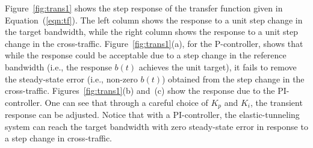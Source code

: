 \documentclass{article}
\begin{document}
Figure~\ref{fig:trans1} shows
 the step response of the
transfer function given in
Equation~(\ref{eqn:tf}).
The left column 
shows  the response to a unit step change
in the target bandwidth, while the right column 
shows the
response to a unit step change in the cross-traffic. 
Figure~\ref{fig:trans1}(a),
for the P-controller,
shows that while the response could be acceptable due to
a step change in the reference bandwidth (i.e., the response $b(t)$ achieves the unit target), 
it fails to remove the steady-state
error (i.e., non-zero $b(t)$) obtained from the step change in the cross-traffic. 
Figures~\ref{fig:trans1}(b) and~(c)
show the response due to the PI-controller. 
One can
see that through a careful choice of $K_p$ and $K_i$, the transient
response can be adjusted.  
Notice that with a PI-controller,
the elastic-tunneling system can reach the target bandwidth with
zero steady-state error in response to a step change
in cross-traffic.
\end{document}
